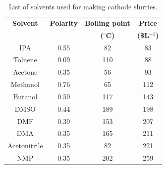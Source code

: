\begin{table}
\caption{List of solvents used for making cathode slurries.} \label{t1}
\begin{center}
 \begin{tabular}{|c|c|c|c|} 
 \hline
 \textbf{Solvent} & \textbf{Polarity} & \textbf{Boiling point} & \textbf{Price}\\
 \textbf{} & \textbf{} & \textbf{($^{\circ}$C)} & \textbf{(\$L$^{-1}$)}\\
 \hline
 \hline
IPA & 0.55 & 82 & 83 \\
Toluene & 0.09 & 110 & 88 \\
Acetone & 0.35 & 56 & 93 \\
Methanol & 0.76 & 65 & 112 \\ 
Butanol & 0.59 & 117 & 143 \\
DMSO & 0.44 & 189 & 198 \\
DMF & 0.39 & 153 & 207 \\
DMA & 0.35 & 165 & 211 \\
Acetonitrile & 0.35 & 82 & 221 \\
NMP & 0.35 & 202 & 259 \\
 \hline
\end{tabular}
\end{center}
\end{table}

